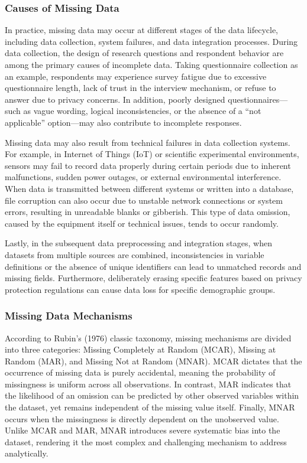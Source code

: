 \documentclass[twocolumn, 9pt]{extarticle}
\begin{document}
\subsubsection{Causes of Missing Data}
In practice, missing data may occur at different stages of the data lifecycle, including data collection, system failures, and data integration processes. 
During data collection, the design of research questions and respondent behavior are among the primary causes of incomplete data. Taking questionnaire collection as an example, respondents may experience survey fatigue due to excessive questionnaire length, lack of trust in the interview mechanism, or refuse to answer due to privacy concerns. In addition, poorly designed questionnaires—such as vague wording, logical inconsistencies, or the absence of a “not applicable” option—may also contribute to incomplete responses.\cite{popovich2025treat} 

Missing data may also result from technical failures in data collection systems. For example, in Internet of Things (IoT) or scientific experimental environments, sensors may fail to record data properly during certain periods due to inherent malfunctions, sudden power outages, or external environmental interference.\cite{noor2023iot} When data is transmitted between different systems or written into a database, file corruption can also occur due to unstable network connections or system errors, resulting in unreadable blanks or gibberish. This type of data omission, caused by the equipment itself or technical issues, tends to occur randomly. 

Lastly, in the subsequent data preprocessing and integration stages, when datasets from multiple sources are combined, inconsistencies in variable definitions or the absence of unique identifiers can lead to unmatched records and missing fields. Furthermore, deliberately erasing specific features based on privacy protection regulations can cause data loss for specific demographic groups.\cite{alwateer2024missing}

\subsubsection{Missing Data Mechanisms}
According to Rubin's (1976) classic taxonomy, missing mechanisms are divided into three categories: Missing Completely at Random (MCAR), Missing at Random (MAR), and Missing Not at Random (MNAR). MCAR dictates that the occurrence of missing data is purely accidental, meaning the probability of missingness is uniform across all observations. In contrast, MAR indicates that the likelihood of an omission can be predicted by other observed variables within the dataset, yet remains independent of the missing value itself. Finally, MNAR occurs when the missingness is directly dependent on the unobserved value. Unlike MCAR and MAR, MNAR introduces severe systematic bias into the dataset, rendering it the most complex and challenging mechanism to address analytically.\cite{rubin1976inference}
\end{document}
